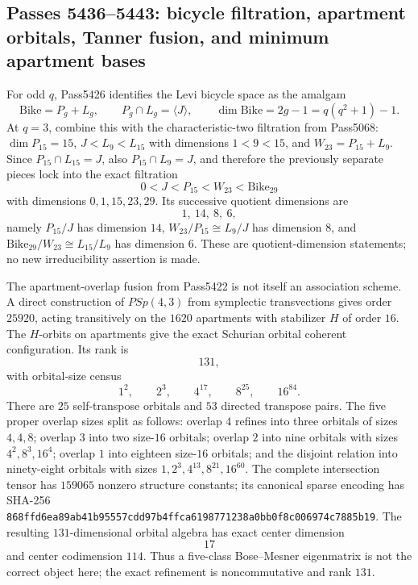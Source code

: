 \ifdefined\WPassFiveFourThreeSixLoaded\else
\gdef\WPassFiveFourThreeSixLoaded{1}
\subsection*{Passes 5436--5443: bicycle filtration, apartment orbitals, Tanner fusion, and minimum apartment bases}

For odd $q$, Pass5426 identifies the Levi bicycle space as the amalgam
\[
 \mathrm{Bike}=P_g+L_g,\qquad P_g\cap L_g=\langle J\rangle,
 \qquad \dim\mathrm{Bike}=2g-1=q(q^2+1)-1.
\]
At $q=3$, combine this with the characteristic-two filtration from Pass5068:
$\dim P_{15}=15$, $J<L_9<L_{15}$ with dimensions $1<9<15$, and
$W_{23}=P_{15}+L_9$.  Since $P_{15}\cap L_{15}=J$, also
$P_{15}\cap L_9=J$, and therefore the previously separate pieces lock into the
exact filtration
\[
 \boxed{0<J<P_{15}<W_{23}<\mathrm{Bike}_{29}}
\]
with dimensions $0,1,15,23,29$.  Its successive quotient dimensions are
\[
 \boxed{1,\ 14,\ 8,\ 6},
\]
namely $P_{15}/J$ has dimension $14$,
$W_{23}/P_{15}\cong L_9/J$ has dimension $8$, and
$\mathrm{Bike}_{29}/W_{23}\cong L_{15}/L_9$ has dimension $6$.  These are
quotient-dimension statements; no new irreducibility assertion is made.

The apartment-overlap fusion from Pass5422 is not itself an association scheme.
A direct construction of $PSp(4,3)$ from symplectic transvections gives order
$25920$, acting transitively on the $1620$ apartments with stabilizer $H$ of
order $16$.  The $H$-orbits on apartments give the exact Schurian orbital
coherent configuration.  Its rank is
\[
 \boxed{131},
\]
with orbital-size census
\[
 1^2,\qquad 2^3,\qquad 4^{17},\qquad 8^{25},\qquad 16^{84}.
\]
There are $25$ self-transpose orbitals and $53$ directed transpose pairs.  The
five proper overlap sizes split as follows: overlap $4$ refines into three
orbitals of sizes $4,4,8$; overlap $3$ into two size-$16$ orbitals; overlap $2$
into nine orbitals with sizes $4^2,8^3,16^4$; overlap $1$ into eighteen
size-$16$ orbitals; and the disjoint relation into ninety-eight orbitals with
sizes $1,2^3,4^{13},8^{21},16^{60}$.  The complete intersection tensor has
$159065$ nonzero structure constants; its canonical sparse encoding has SHA-256
\texttt{868ffd6ea89ab41b95557cdd97b4ffca6198771238a0bb0f8c006974c7885b19}.
The resulting $131$-dimensional orbital algebra has exact center dimension
\[
 \boxed{17}
\]
and center codimension $114$.  Thus a five-class Bose--Mesner eigenmatrix is not
the correct object here; the exact refinement is noncommutative and rank $131$.

